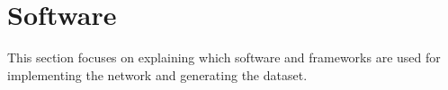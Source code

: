 \section{Software}
This section focuses on explaining which software and frameworks are used for implementing the network and generating the dataset.